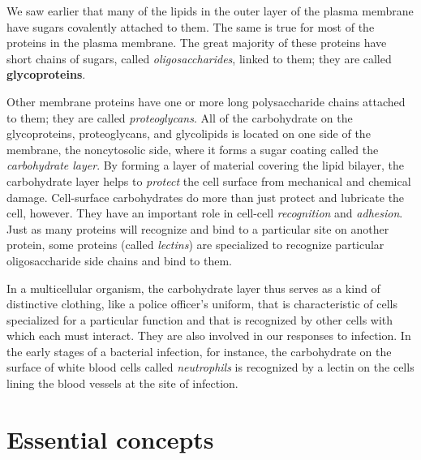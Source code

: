 We saw earlier that many of the lipids in the outer layer of the plasma
membrane have sugars covalently attached to them. The same is true
for most of the proteins in the plasma membrane. The great majority of
these proteins have short chains of sugars, called \textit{oligosaccharides}, linked
to them; they are called \textbf{glycoproteins}. 

Other membrane proteins have
one or more long polysaccharide chains attached to them; they are called
\textit{proteoglycans}. All of the carbohydrate on the glycoproteins, proteoglycans,
and glycolipids is located on one side of the membrane, the noncytosolic
side, where it forms a sugar coating called the \textit{carbohydrate layer}.
By forming a layer of material covering the lipid bilayer, the carbohydrate
layer helps to \textit{protect} the cell surface from mechanical and chemical
damage.
Cell-surface carbohydrates do more than just protect and lubricate the
cell, however. They have an important role in cell-cell \textit{recognition} and
\textit{adhesion}. Just as many proteins will recognize and bind to a particular
site on another protein, some proteins (called \textit{lectins}) are specialized to
recognize particular oligosaccharide side chains and bind to them.

In a multicellular organism, the carbohydrate layer thus serves as a kind
of distinctive clothing, like a police officer’s uniform, that is characteristic
of cells specialized for a particular function and that is recognized
by other cells with which each must interact. They are also involved
in our responses to infection. In the early stages of a bacterial infection,
for instance, the carbohydrate on the surface of white blood cells called
\textit{neutrophils} is recognized by a lectin on the cells lining the blood vessels
at the site of infection.

\section{Essential concepts}

